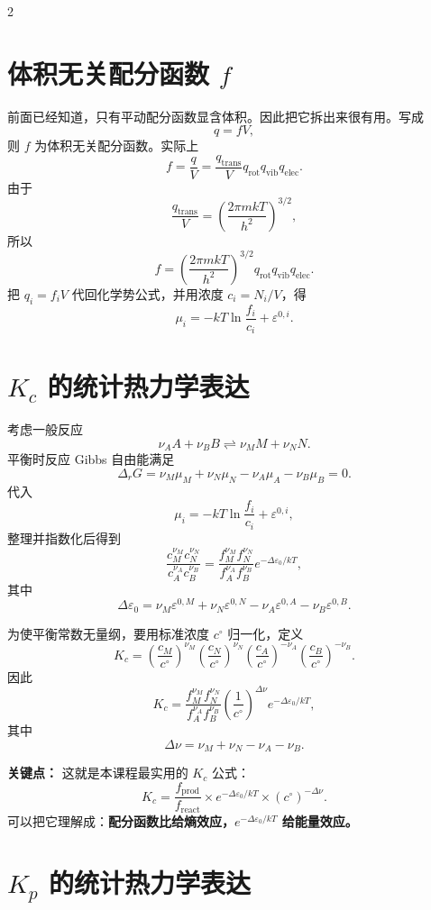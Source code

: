 \documentclass[a4paper,9pt]{article}
\newenvironment{keypoint}
{\par\vspace{0.3em}\noindent\begin{tcolorbox}[colback=keybg,colframe=keycolor,boxrule=0.5pt,arc=2pt,left=2pt,right=2pt,top=2pt,bottom=2pt,boxsep=0pt]\noindent\textcolor{keycolor}{\textbf{关键点：}}}
{\end{tcolorbox}\par\vspace{0.3em}}
\begin{document}
\begin{multicols}{2}
	\section{体积无关配分函数 $f$}

	前面已经知道，只有平动配分函数显含体积。因此把它拆出来很有用。写成
	\[
		q=fV,
	\]
	则 $f$ 为体积无关配分函数。实际上
	\[
		f=\frac{q}{V}=\frac{q_{\mathrm{trans}}}{V}q_{\mathrm{rot}}q_{\mathrm{vib}}q_{\mathrm{elec}}.
	\]
	由于
	\[
		\frac{q_{\mathrm{trans}}}{V}=\left(\frac{2\pi mkT}{h^2}\right)^{3/2},
	\]
	所以
	\[
		f=\left(\frac{2\pi mkT}{h^2}\right)^{3/2}q_{\mathrm{rot}}q_{\mathrm{vib}}q_{\mathrm{elec}}.
	\]
	把 $q_i=f_iV$ 代回化学势公式，并用浓度 $c_i=N_i/V$，得
	\[
		\mu_i=-kT\ln\frac{f_i}{c_i}+\varepsilon^{0,i}.
	\]

	\section{$K_c$ 的统计热力学表达}

	考虑一般反应
	\[
		\nu_AA+\nu_BB\rightleftharpoons \nu_MM+\nu_NN.
	\]
	平衡时反应 Gibbs 自由能满足
	\[
		\Delta_rG=\nu_M\mu_M+\nu_N\mu_N-\nu_A\mu_A-\nu_B\mu_B=0.
	\]
	代入
	\[
		\mu_i=-kT\ln\frac{f_i}{c_i}+\varepsilon^{0,i},
	\]
	整理并指数化后得到
	\[
		\frac{c_M^{\nu_M}c_N^{\nu_N}}{c_A^{\nu_A}c_B^{\nu_B}}
		=\frac{f_M^{\nu_M}f_N^{\nu_N}}{f_A^{\nu_A}f_B^{\nu_B}}
		e^{-\Delta\varepsilon_0/kT},
	\]
	其中
	\[
		\Delta\varepsilon_0=\nu_M\varepsilon^{0,M}+\nu_N\varepsilon^{0,N}-\nu_A\varepsilon^{0,A}-\nu_B\varepsilon^{0,B}.
	\]

	为使平衡常数无量纲，要用标准浓度 $c^\circ$ 归一化，定义
	\[
		K_c=\left(\frac{c_M}{c^\circ}\right)^{\nu_M}\left(\frac{c_N}{c^\circ}\right)^{\nu_N}
		\left(\frac{c_A}{c^\circ}\right)^{-\nu_A}
		\left(\frac{c_B}{c^\circ}\right)^{-\nu_B}.
	\]
	因此
	\[
		K_c=\frac{f_M^{\nu_M}f_N^{\nu_N}}{f_A^{\nu_A}f_B^{\nu_B}}
		\left(\frac1{c^\circ}\right)^{\Delta\nu}
		e^{-\Delta\varepsilon_0/kT},
	\]
	其中
	\[
		\Delta\nu=\nu_M+\nu_N-\nu_A-\nu_B.
	\]

	\begin{keypoint}
		这就是本课程最实用的 $K_c$ 公式：
		\[
			K_c=\frac{f_{\text{prod}}}{f_{\text{react}}}\times e^{-\Delta\varepsilon_0/kT}\times (c^\circ)^{-\Delta\nu}.
		\]
		可以把它理解成：\textbf{配分函数比给熵效应，$e^{-\Delta\varepsilon_0/kT}$ 给能量效应。}
	\end{keypoint}

	\section{$K_p$ 的统计热力学表达}


\end{multicols}
\end{document}
